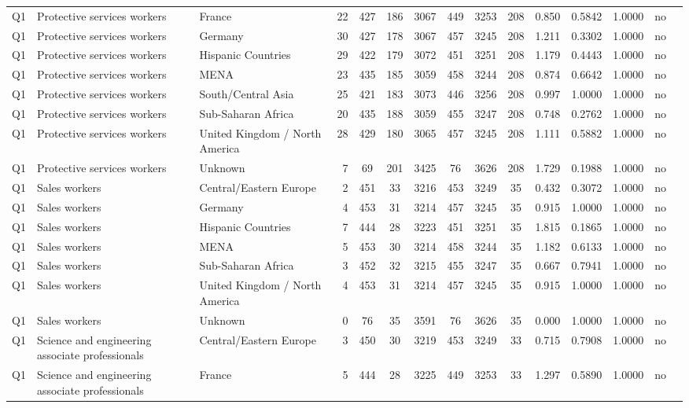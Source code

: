\begin{longtable}{lllrcccccccccll}
Q1 & Protective services workers & France & 22 & 427 & 186 & 3067 & 449 & 3253 & 208 & 0.850 & 0.5842 & 1.0000 & no \\
Q1 & Protective services workers & Germany & 30 & 427 & 178 & 3067 & 457 & 3245 & 208 & 1.211 & 0.3302 & 1.0000 & no \\
Q1 & Protective services workers & Hispanic Countries & 29 & 422 & 179 & 3072 & 451 & 3251 & 208 & 1.179 & 0.4443 & 1.0000 & no \\
Q1 & Protective services workers & MENA & 23 & 435 & 185 & 3059 & 458 & 3244 & 208 & 0.874 & 0.6642 & 1.0000 & no \\
Q1 & Protective services workers & South/Central Asia & 25 & 421 & 183 & 3073 & 446 & 3256 & 208 & 0.997 & 1.0000 & 1.0000 & no \\
Q1 & Protective services workers & Sub-Saharan Africa & 20 & 435 & 188 & 3059 & 455 & 3247 & 208 & 0.748 & 0.2762 & 1.0000 & no \\
Q1 & Protective services workers & United Kingdom / North America & 28 & 429 & 180 & 3065 & 457 & 3245 & 208 & 1.111 & 0.5882 & 1.0000 & no \\
Q1 & Protective services workers & Unknown & 7 & 69 & 201 & 3425 & 76 & 3626 & 208 & 1.729 & 0.1988 & 1.0000 & no \\
Q1 & Sales workers & Central/Eastern Europe & 2 & 451 & 33 & 3216 & 453 & 3249 & 35 & 0.432 & 0.3072 & 1.0000 & no \\
Q1 & Sales workers & Germany & 4 & 453 & 31 & 3214 & 457 & 3245 & 35 & 0.915 & 1.0000 & 1.0000 & no \\
Q1 & Sales workers & Hispanic Countries & 7 & 444 & 28 & 3223 & 451 & 3251 & 35 & 1.815 & 0.1865 & 1.0000 & no \\
Q1 & Sales workers & MENA & 5 & 453 & 30 & 3214 & 458 & 3244 & 35 & 1.182 & 0.6133 & 1.0000 & no \\
Q1 & Sales workers & Sub-Saharan Africa & 3 & 452 & 32 & 3215 & 455 & 3247 & 35 & 0.667 & 0.7941 & 1.0000 & no \\
Q1 & Sales workers & United Kingdom / North America & 4 & 453 & 31 & 3214 & 457 & 3245 & 35 & 0.915 & 1.0000 & 1.0000 & no \\
Q1 & Sales workers & Unknown & 0 & 76 & 35 & 3591 & 76 & 3626 & 35 & 0.000 & 1.0000 & 1.0000 & no \\
Q1 & Science and engineering associate professionals & Central/Eastern Europe & 3 & 450 & 30 & 3219 & 453 & 3249 & 33 & 0.715 & 0.7908 & 1.0000 & no \\
Q1 & Science and engineering associate professionals & France & 5 & 444 & 28 & 3225 & 449 & 3253 & 33 & 1.297 & 0.5890 & 1.0000 & no \\

\end{longtable}
